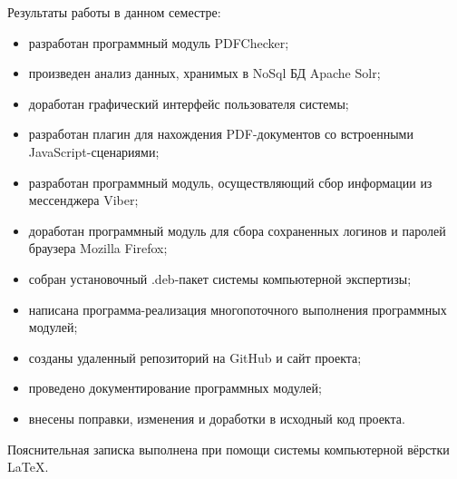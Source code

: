 Результаты работы в данном семестре:

\begin{itemize}
  \item разработан программный модуль PDFChecker;
  \item произведен анализ данных, хранимых в NoSql БД Apache Solr; 
  \item доработан графический интерфейс пользователя системы;
  \item разработан плагин для нахождения PDF-документов со встроенными JavaScript-сценариями;
  \item разработан программный модуль, осуществляющий сбор информации из мессенджера Viber;  
  \item доработан программный модуль для сбора сохраненных логинов и паролей браузера Mozilla Firefox;  
  \item собран установочный .deb-пакет системы компьютерной экспертизы;  
  \item написана программа-реализация многопоточного выполнения программных модулей; 
  \item созданы удаленный репозиторий на GitHub и сайт проекта;  
  \item проведено документирование программных модулей;
  \item внесены поправки, изменения и доработки в исходный код проекта.
\end{itemize}

Пояснительная записка выполнена при помощи системы компьютерной вёрстки \LaTeX.
